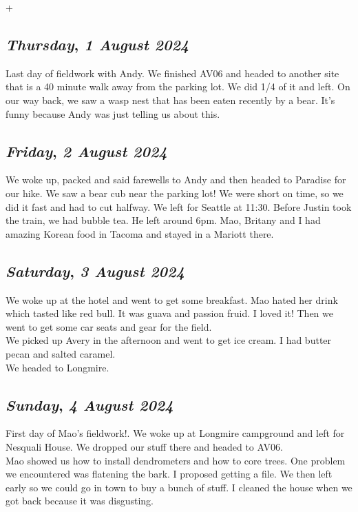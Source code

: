 +\begin{center}
\section*{\month}
\end{center}

\def\day{\textit{1 August 2024}}
\def\weekday{\textit{Thursday}}
\subsection*{\weekday, \day}
Last day of fieldwork with Andy. We finished AV06 and headed to another site that is a 40 minute walk away from the parking lot. We did 1/4 of it and left. On our way back, we saw a wasp nest that has been eaten recently by a bear. It's funny because Andy was just telling us about this. 

\def\day{\textit{2 August 2024}}
\def\weekday{\textit{Friday}}
\subsection*{\weekday, \day}
We woke up, packed and said farewells to Andy and then headed to Paradise for our hike. We saw a bear cub near the parking lot! We were short on time, so we did it fast and had to cut halfway. We left for Seattle at 11:30. Before Justin took the train, we had bubble tea. He left around 6pm. Mao, Britany and I had amazing Korean food in Tacoma and stayed in a Mariott there. 

\def\day{\textit{3 August 2024}}
\def\weekday{\textit{Saturday}}
\subsection*{\weekday, \day}
We woke up at the hotel and went to get some breakfast. Mao hated her drink which tasted like red bull. It was guava and passion fruid. I loved it! Then we went to get some car seats and gear for the field.\\
We picked up Avery in the afternoon and went to get ice cream. I had butter pecan and salted caramel. \\
We headed to Longmire. 

\def\day{\textit{4 August 2024}}
\def\weekday{\textit{Sunday}}
\subsection*{\weekday, \day}
First day of Mao's fieldwork!. We woke up at Longmire campground and left for Nesquali House. We dropped our stuff there and headed to AV06. \\
Mao showed us how to install dendrometers and how to core trees. One problem we encountered was flatening the bark. I proposed getting a file. We then left early so we could go in town to buy a bunch of stuff. I cleaned the house when we got back because it was disgusting. 

